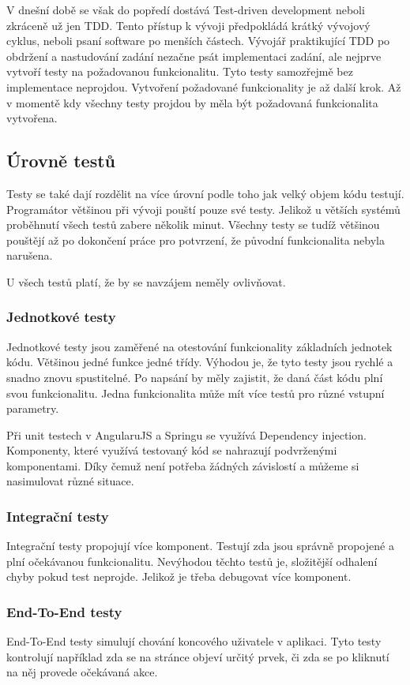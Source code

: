 \documentclass[czech,master,public,dept460,male,cpdeclaration,twoside]{diploma}
\begin{document}
V dnešní době se však do popředí dostává Test-driven development neboli zkráceně už jen TDD. Tento přístup k vývoji předpokládá krátký vývojový cyklus, neboli psaní software po menších částech. Vývojář praktikující TDD po obdržení a nastudování zadání nezačne psát implementaci zadání, ale nejprve vytvoří testy na požadovanou funkcionalitu. Tyto testy samozřejmě bez implementace neprojdou. Vytvoření požadované funkcionality je až další krok. Až v momentě kdy všechny testy projdou by měla být požadovaná funkcionalita vytvořena.

\subsection{Úrovně testů}
Testy se také dají rozdělit na více úrovní podle toho jak velký objem kódu testují. Programátor většinou při vývoji pouští pouze své testy. Jelikož u větších systémů proběhnutí všech testů zabere několik minut. Všechny testy se tudíž většinou pouštějí až po dokončení práce pro potvrzení, že původní funkcionalita nebyla narušena.

U všech testů platí, že by se navzájem neměly ovlivňovat.

\subsubsection{Jednotkové testy}
Jednotkové testy jsou zaměřené na otestování funkcionality základních jednotek kódu. Většinou jedné funkce jedné třídy. Výhodou je, že tyto testy jsou rychlé a snadno znovu spustitelné. Po napsání by měly zajistit, že daná část kódu plní svou funkcionalitu. Jedna funkcionalita může mít více testů pro různé vstupní parametry.

Při unit testech v AngularuJS a Springu se využívá Dependency injection. Komponenty, které využívá testovaný kód se nahrazují podvrženými komponentami. Díky čemuž není potřeba žádných závislostí a můžeme si nasimulovat různé situace.

\subsubsection{Integrační testy}
Integrační testy propojují více komponent. Testují zda jsou správně propojené a plní očekávanou funkcionalitu. Nevýhodou těchto testů je, složitější odhalení chyby pokud test neprojde. Jelikož je třeba debugovat více komponent. 

\subsubsection{End-To-End testy}
End-To-End testy simulují chování koncového uživatele v aplikaci. Tyto testy kontrolují například zda se na stránce objeví určitý prvek, či zda se po kliknutí na něj provede očekávaná akce.
\end{document}
